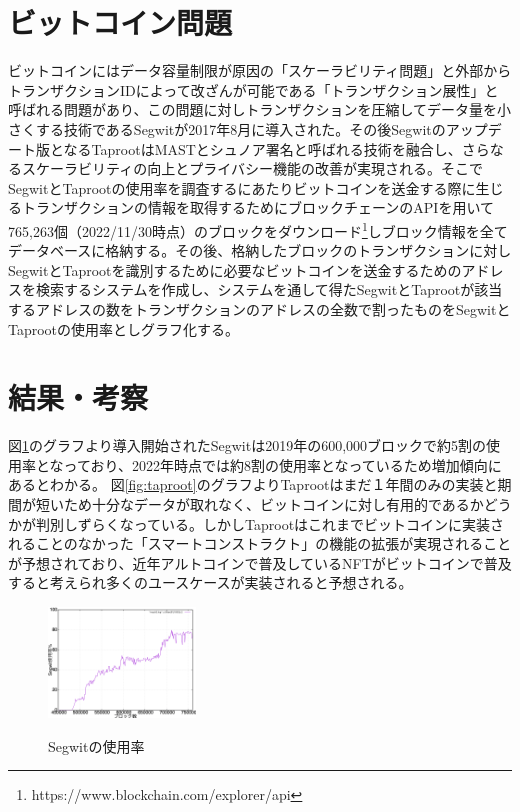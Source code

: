 \documentclass[10pt,twocolumn, a4j]{jsarticle}
\begin{document}
\section{ビットコイン問題}
ビットコインにはデータ容量制限が原因の「スケーラビリティ問題」と外部からトランザクションIDによって改ざんが可能である「トランザクション展性」と呼ばれる問題があり、この問題に対しトランザクションを圧縮してデータ量を小さくする技術であるSegwitが2017年8月に導入された。その後Segwitのアップデート版となるTaprootはMASTとシュノア署名と呼ばれる技術\cite{thapa2021identifying}を融合し、さらなるスケーラビリティの向上とプライバシー機能の改善が実現される。そこでSegwitとTaprootの使用率を調査するにあたりビットコインを送金する際に生じるトランザクションの情報を取得するためにブロックチェーンのAPIを用いて765,263個（2022/11/30時点）のブロックをダウンロード\footnote{https://www.blockchain.com/explorer/api}しブロック情報を全てデータベースに格納する。その後、格納したブロックのトランザクションに対しSegwitとTaprootを識別するために必要なビットコインを送金するためのアドレスを検索するシステムを作成し、システムを通して得たSegwitとTaprootが該当するアドレスの数をトランザクションのアドレスの全数で割ったものをSegwitとTaprootの使用率としグラフ化する。

\section{結果・考察}
図\ref{fig:segwit}のグラフより導入開始されたSegwitは2019年の600,000ブロックで約5割の使用率となっており、2022年時点では約8割の使用率となっているため増加傾向にあるとわかる。
図\ref{fig:taproot}のグラフよりTaprootはまだ１年間のみの実装と期間が短いため十分なデータが取れなく、ビットコインに対し有用的であるかどうかが判別しずらくなっている。しかしTaprootはこれまでビットコインに実装されることのなかった「スマートコンストラクト」の機能の拡張が実現されることが予想されており、近年アルトコインで普及しているNFTがビットコインで普及すると考えられ多くのユースケースが実装されると予想される。

\vspace{-2mm}

\begin{figure}[h]
    \centering
    \includegraphics[width=0.35\textwidth]{segwitfigure.png}
　    \caption{Segwitの使用率}
    \label{fig:segwit}
\end{figure}
\end{document}

